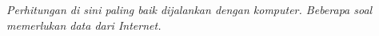 \begin{exercises}
  \item[]\emph{Perhitungan di sini paling baik dijalankan dengan komputer.
      Beberapa soal memerlukan data dari Internet.}

\end{exercises}
